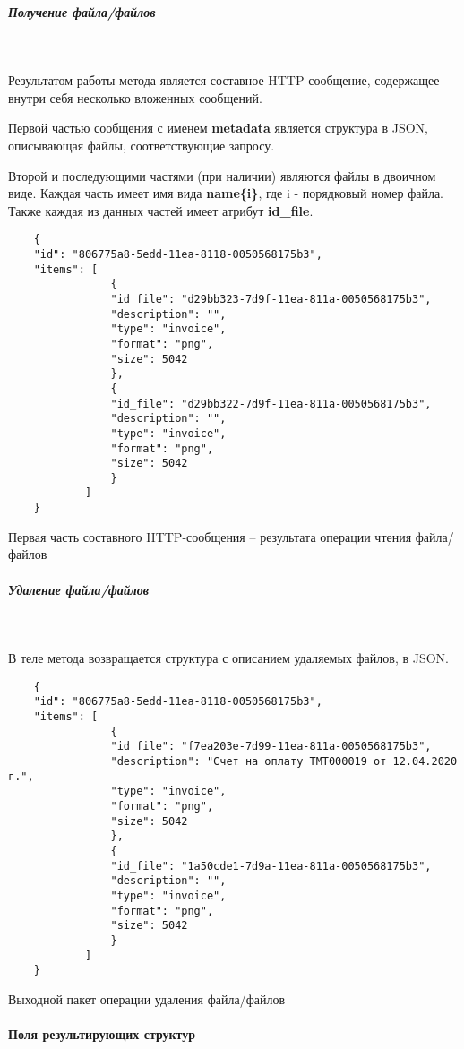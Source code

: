 \documentclass[11pt, a4paper]{article}
\begin{document}
\subparagraph{Получение файла/файлов}\

Результатом работы метода является составное HTTP-сообщение, содержащее внутри себя несколько вложенных сообщений.

Первой частью сообщения с именем \textbf{metadata} является структура в JSON, описывающая файлы, соответствующие запросу.

Второй и последующими частями (при наличии) являются файлы в двоичном виде. Каждая часть имеет имя вида \textbf{name\{i\}}, где i - порядковый номер файла. Также каждая из данных частей имеет атрибут \textbf{id\_file}.

\begin{listing}[H]
	\begin{verbatim}
	{	
	"id": "806775a8-5edd-11ea-8118-0050568175b3",
	"items": [
				{
				"id_file": "d29bb323-7d9f-11ea-811a-0050568175b3",
				"description": "",
				"type": "invoice",
				"format": "png",
				"size": 5042
				},
				{
				"id_file": "d29bb322-7d9f-11ea-811a-0050568175b3",
				"description": "",
				"type": "invoice",
				"format": "png",
				"size": 5042
				}
			]
	}
	\end{verbatim}
	\caption{Первая часть составного HTTP-сообщения -- результата операции чтения файла/файлов}
\end{listing}	

\subparagraph{Удаление файла/файлов}\

В теле метода возвращается структура с описанием удаляемых файлов, в JSON.

\begin{listing}[H]
	\begin{verbatim}
	{
	"id": "806775a8-5edd-11ea-8118-0050568175b3",
	"items": [
				{
				"id_file": "f7ea203e-7d99-11ea-811a-0050568175b3",
				"description": "Счет на оплату ТМТ000019 от 12.04.2020 г.",
				"type": "invoice",
				"format": "png",
				"size": 5042
				},
				{
				"id_file": "1a50cde1-7d9a-11ea-811a-0050568175b3",
				"description": "",
				"type": "invoice",
				"format": "png",
				"size": 5042
				}
			]
	}
	\end{verbatim}
	\caption{Выходной пакет операции удаления файла/файлов}
\end{listing}

\paragraph{Поля результирующих структур}\
\end{document}
